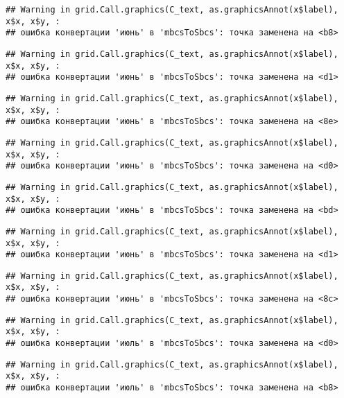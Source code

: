 \documentclass[
]{article}
\begin{document}
\begin{verbatim}
## Warning in grid.Call.graphics(C_text, as.graphicsAnnot(x$label), x$x, x$y, :
## ошибка конвертации 'июнь' в 'mbcsToSbcs': точка заменена на <b8>
\end{verbatim}

\begin{verbatim}
## Warning in grid.Call.graphics(C_text, as.graphicsAnnot(x$label), x$x, x$y, :
## ошибка конвертации 'июнь' в 'mbcsToSbcs': точка заменена на <d1>
\end{verbatim}

\begin{verbatim}
## Warning in grid.Call.graphics(C_text, as.graphicsAnnot(x$label), x$x, x$y, :
## ошибка конвертации 'июнь' в 'mbcsToSbcs': точка заменена на <8e>
\end{verbatim}

\begin{verbatim}
## Warning in grid.Call.graphics(C_text, as.graphicsAnnot(x$label), x$x, x$y, :
## ошибка конвертации 'июнь' в 'mbcsToSbcs': точка заменена на <d0>
\end{verbatim}

\begin{verbatim}
## Warning in grid.Call.graphics(C_text, as.graphicsAnnot(x$label), x$x, x$y, :
## ошибка конвертации 'июнь' в 'mbcsToSbcs': точка заменена на <bd>
\end{verbatim}

\begin{verbatim}
## Warning in grid.Call.graphics(C_text, as.graphicsAnnot(x$label), x$x, x$y, :
## ошибка конвертации 'июнь' в 'mbcsToSbcs': точка заменена на <d1>
\end{verbatim}

\begin{verbatim}
## Warning in grid.Call.graphics(C_text, as.graphicsAnnot(x$label), x$x, x$y, :
## ошибка конвертации 'июнь' в 'mbcsToSbcs': точка заменена на <8c>
\end{verbatim}

\begin{verbatim}
## Warning in grid.Call.graphics(C_text, as.graphicsAnnot(x$label), x$x, x$y, :
## ошибка конвертации 'июль' в 'mbcsToSbcs': точка заменена на <d0>
\end{verbatim}

\begin{verbatim}
## Warning in grid.Call.graphics(C_text, as.graphicsAnnot(x$label), x$x, x$y, :
## ошибка конвертации 'июль' в 'mbcsToSbcs': точка заменена на <b8>
\end{verbatim}
\end{document}
